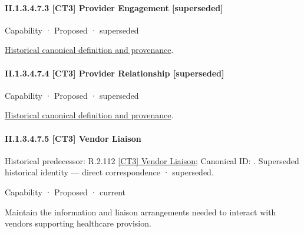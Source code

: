 \paragraph*{II.1.3.4.7.3 [CT3] Provider Engagement [superseded]}
\label{navigation:II.1.3.4.7.3}

\label{element:a0777dbd9b0c4528817e99a7f34aa444}
{\small Capability · Proposed · superseded}\par
\href{../../../../continuum/strategy/capability/a0777dbd9b0c4528817e99a7f34aa444.md}{Historical canonical definition and provenance}.\par
\paragraph*{II.1.3.4.7.4 [CT3] Provider Relationship [superseded]}
\label{navigation:II.1.3.4.7.4}

\label{element:3bb8a3d5b62a4b779442290fe8d5106c}
{\small Capability · Proposed · superseded}\par
\href{../../../../continuum/strategy/capability/3bb8a3d5b62a4b779442290fe8d5106c.md}{Historical canonical definition and provenance}.\par
\paragraph*{II.1.3.4.7.5 [CT3] Vendor Liaison}
\label{navigation:II.1.3.4.7.5}

{\small Historical predecessor: R.2.112 \hyperref[element:29076cbb9fc5442fb25faf43947574f7]{[CT3] Vendor Liaison}; Canonical ID: \texttt{}. Superseded historical identity — direct correspondence · superseded.}\par
\label{element:66358bd6698e4050b12342522fbbb923}
{\small Capability · Proposed · current}\par

Maintain the information and liaison arrangements needed to interact with vendors supporting healthcare provision.



